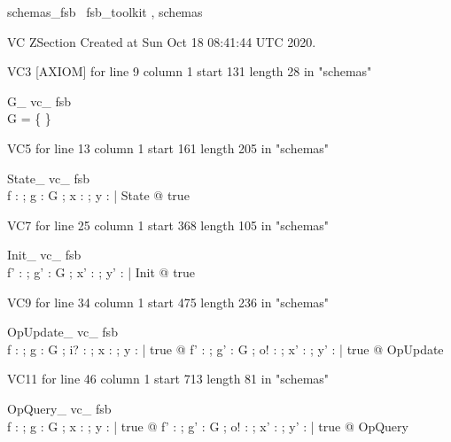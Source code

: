 \documentclass{article}
\begin{document}

\begin{zsection}	 \SECTION schemas\_fsb \parents~fsb\_toolkit , schemas
\end{zsection}

VC ZSection Created at Sun Oct 18 08:41:44 UTC 2020.

VC3 [AXIOM] for line 9 column 1 start 131 length 28 in "schemas"
\begin{theorem}{ G\_ vc\_ fsb}\\
 \lnot G = \{ \} \\

\end{theorem}

VC5 for line 13 column 1 start 161 length 205 in "schemas"
\begin{theorem}{ State\_ vc\_ fsb}\\
 \exists f : \nat \fun \nat ; g : G ; x : \nat ; y : \power \nat | State @ true \\

\end{theorem}

VC7 for line 25 column 1 start 368 length 105 in "schemas"
\begin{theorem}{ Init\_ vc\_ fsb}\\
 \exists f' : \nat \fun \nat ; g' : G ; x' : \nat ; y' : \power \nat | Init @ true \\

\end{theorem}

VC9 for line 34 column 1 start 475 length 236 in "schemas"
\begin{theorem}{ OpUpdate\_ vc\_ fsb}\\
 \forall f : \nat \fun \nat ; g : G ; i? : \nat ; x : \nat ; y : \power \nat | true @ \exists f' : \nat \fun \nat ; g' : G ; o! : \nat ; x' : \nat ; y' : \power \nat | true @ OpUpdate \\

\end{theorem}

VC11 for line 46 column 1 start 713 length 81 in "schemas"
\begin{theorem}{ OpQuery\_ vc\_ fsb}\\
 \forall f : \nat \fun \nat ; g : G ; x : \nat ; y : \power \nat | true @ \exists f' : \nat \fun \nat ; g' : G ; o! : \nat ; x' : \nat ; y' : \power \nat | true @ OpQuery \\

\end{theorem}
\end{document}
